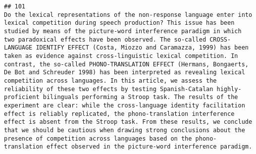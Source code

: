 \documentclass[
  english,
  man]{apa6}
\begin{document}
\begin{verbatim}
## 101                                                                                                                                                                                                                                                                                                                                                                                                                                                                                                                                                                                                                                                                                                                                                                                                                                                                                                                                                                                                                                                                                                                                                                                                                                                                                                                                                                                                                                                                                Do the lexical representations of the non-response language enter into lexical competition during speech production? This issue has been studied by means of the picture-word interference paradigm in which two paradoxical effects have been observed. The so-called CROSS-LANGUAGE IDENTIFY EFFECT (Costa, Miozzo and Caramazza, 1999) has been taken as evidence against cross-linguistic lexical competition. In contrast, the so-called PHONO-TRANSLATION EFFECT (Hermans, Bongaerts, De Bot and Schreuder 1998) has been interpreted as revealing lexical competition across languages. In this article, we assess the reliability of these two effects by testing Spanish-Catalan highly-proficient bilinguals performing a Stroop task. The results of the experiment are clear: while the cross-language identity facilitation effect is reliably replicated, the phono-translation interference effect is absent from the Stroop task. From these results, we conclude that we should be cautious when drawing strong conclusions about the presence of competition across languages based on the phono-translation effect observed in the picture-word interference paradigm.

\end{verbatim}
\end{document}
